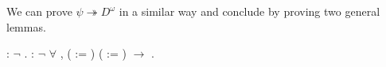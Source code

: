 We can prove $\psi \twoheadrightarrow D^\omega$ in a similar way and
conclude by proving two general lemmas.
\begin{singlespace}
\begin{coqdoccode}
\coqdocnoindent
{}
: \ensuremath{\lnot}
.\coqdoceol
\coqdocemptyline
\coqdocnoindent
{} 
: \ensuremath{\lnot} \ensuremath{\forall}  
,\coqdoceol
\coqdocindent{1.00em}
( := ) ( :=
) 
\ensuremath{\rightarrow}
.\coqdoceol
\end{coqdoccode}
\end{singlespace}
